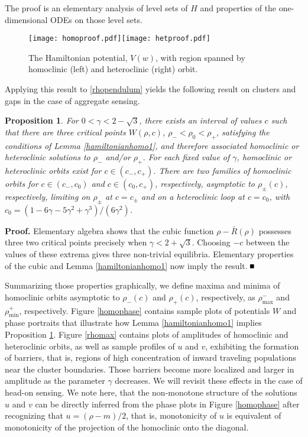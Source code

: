 \documentclass[10pt]{article}
\newtheorem{Proposition}[Lemma]{Proposition}
\newenvironment{Proof}%
 {\begin{trivlist} \item[]{\bf Proof. }}%
 {\hspace*{\fill}$\rule{.4\baselineskip}{.4\baselineskip}$\end{trivlist}}
\begin{document}
The proof is an elementary analysis of level sets of $H$ and properties of the one-dimensional ODEs on those level sets.  
\begin{figure}[h] 
\texttt{[image: homoproof.pdf]}\hfill\texttt{[image: hetproof.pdf]}
\caption{The Hamiltonian potential, $V(w)$, with region spanned by homoclinic (left) and heteroclinic (right) orbit.}
\label{hamiltonianhomo}
\end{figure} 
Applying this result to \eqref{rhopendulum} yields the following result on clusters and gaps in the case of aggregate sensing. 
\begin{Proposition}\label{p:agg}
For  $0< \gamma <2-\sqrt{3}$, there exists an interval of values $c$ such that there are three critical points $W(\rho,c)$,  $\rho_-<\rho_0<\rho_+$, satisfying the conditions of Lemma \ref{hamiltonianhomo1}, and therefore associated  homoclinic or heteroclinic solutions to $\rho_-$ and/or $\rho_+$. For each fixed value of $\gamma$, homoclinic or heteroclinic orbits exist for $c\in (c_-,c_+)$. There are two families of homoclinic orbits for $c\in (c_-,c_0)$ and $c\in (c_0,c_+)$, respectively, asymptotic to $\rho_\pm(c)$, respectively, limiting on $\rho_\pm$ at $c=c_\pm$ and on a heteroclinic loop at $c=c_0$, with $c_0=(1-6\gamma-5\gamma^2+\gamma^3)/(6\gamma^2)$.
\end{Proposition}
\begin{Proof}
Elementary algebra shows that the cubic function $\rho-\bar{R}(\rho)$ possesses three two critical points precisely when $\gamma <2+\sqrt{3}$. Choosing $-c$ between the values of these extrema gives three non-trivial equilibria. Elementary properties of the cubic and Lemma \ref{hamiltonianhomo1} now imply the result.
\end{Proof}
Summarizing those properties graphically, we define maxima and minima of homoclinic orbits asymptotic to $\rho_-(c)$ and $\rho_+(c)$, respectively, as $\rho_\mathrm{max}^-$ and $\rho_\mathrm{min}^+$, respectively.  Figure \ref{homophase} contains sample plots of potentials $W$ and phase portraits that illustrate how  Lemma \ref{hamiltonianhomo1} implies Proposition \ref{p:agg}. Figure \ref{rhomax} contains plots of amplitudes of homoclinic and heteroclinic orbits, as well as sample profiles of $u$ and $v$, exhibiting the formation of barriers, that is, regions of high concentration of inward traveling populations near the cluster boundaries. Those barriers become more localized and larger in amplitude as the parameter $\gamma$ decreases. We will revisit these effects in the case of head-on sensing. We note here, that the non-monotone structure of the solutions $u$ and $v$ can be directly inferred from the phase plots in Figure  \ref{homophase} after recognizing that  $u=(\rho-m)/2$, that is, monotonicity of $u$ is equivalent of monotonicity of the projection of the homoclinic onto the diagonal. 
\end{document}
